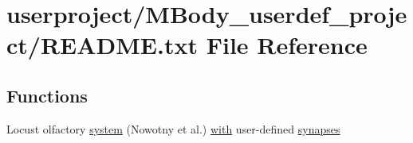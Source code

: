 \hypertarget{userproject_2MBody__userdef__project_2README_8txt}{\section{userproject/\+M\+Body\+\_\+userdef\+\_\+project/\+R\+E\+A\+D\+M\+E.txt File Reference}
\label{userproject_2MBody__userdef__project_2README_8txt}
}
\subsection*{Functions}
\begin{DoxyCompactItemize}
\item 
Locust olfactory \hyperlink{userproject_2MBody__userdef__project_2README_8txt_aa59f82cbdc8faecbe63db8c36a91a73c}{system} (Nowotny et al.) \hyperlink{userproject_2OneComp__project_2README_8txt_ace09bb40fbf4457ad9a9340a67a4fa9a}{with} user-\/defined \hyperlink{userproject_2SynDelay__project_2README_8txt_a7ef8cfd0b18b59bc74f8817d93fc159f}{synapses}
\end{DoxyCompactItemize}
